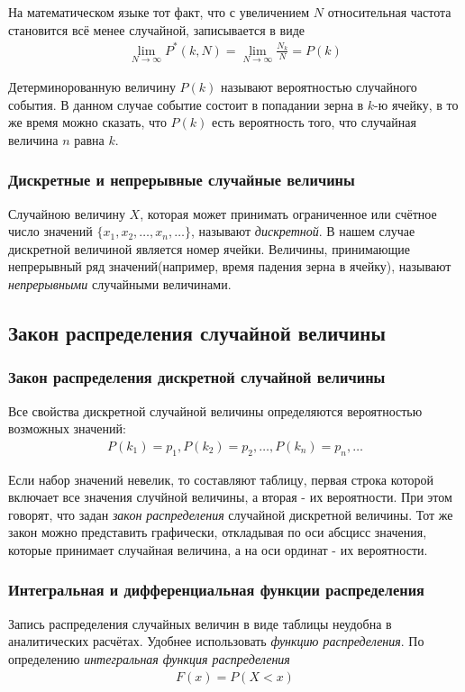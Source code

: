 На математическом языке тот факт, что с увеличением $N$ относительная частота становится всё менее случайной, записывается в виде
\begin{align}
	\lim\limits_{N\to\infty}P^\ast(k,N) = \lim\limits_{N\to\infty}\frac{N_k}{N} = P(k)
\end{align}

Детерминорованную величину $P(k)$ называют вероятностью случайного события. В данном случае событие состоит в попадании зерна в $k$-ю ячейку, в то же время можно сказать, что $P(k)$ есть вероятность того, что случайная величина $n$ равна $k$.

\subsubsection{Дискретные и непрерывные случайные величины}
Случайною величину $X$, которая может принимать ограниченное или счётное число значений $\{x_1, x_2,\dots, x_n,\dots\}$, называют \textit{дискретной}. В нашем случае дискретной величиной является номер ячейки.
Величины, принимающие непрерывный ряд значений(например, время падения зерна в ячейку), называют \textit{непрерывными} случайными величинами.

\subsection{Закон распределения случайной величины}
\subsubsection{Закон распределения дискретной случайной величины}
Все свойства дискретной случайной величины определяются вероятностью возможных значений:
\begin{align*}
	P(k_1) = p_1, P(k_2) = p_2, \dots, P(k_n) = p_n, \dots
\end{align*}
 
Если набор значений невелик, то составляют таблицу, первая строка которой включает все значения случйной величины, а вторая - их вероятности. При этом говорят, что задан \textit{закон распределения} случайной дискретной величины. Тот же закон можно представить графически, откладывая по оси абсцисс значения, которые принимает случайная величина, а на оси ординат - их вероятности. 
 
\subsubsection{Интегральная и дифференциальная функции распределения}
Запись распределения случайных величин в виде таблицы неудобна в аналитических расчётах. Удобнее использовать \textit{функцию распределения}. По определению \textit{интегральная функция распределения}
\begin{align} \label{integr_func_raspr}
	F(x) = P(X < x)
\end{align}

